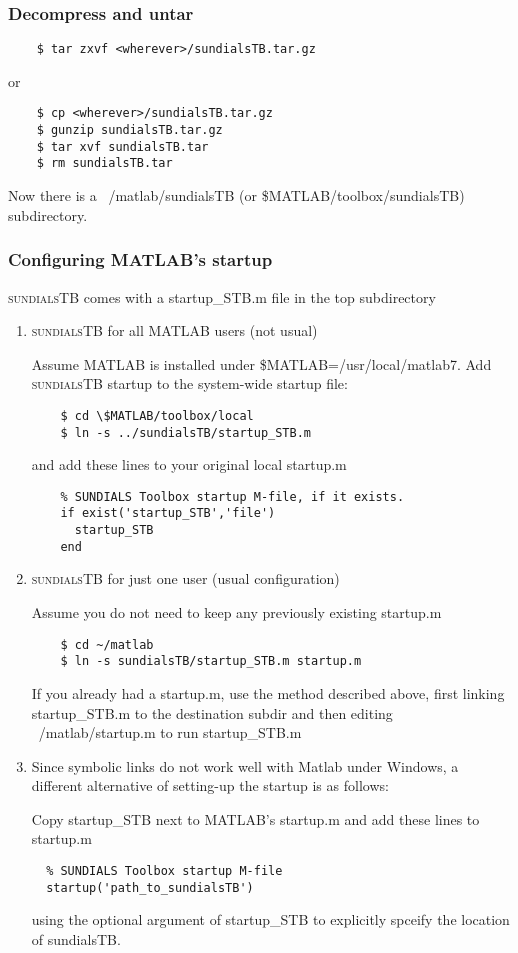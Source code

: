 \documentclass[titlepage,10pt]{article}
\newcommand{\sundialsTB}{{\normalfont\scshape sundialsTB}}
\begin{document}
\subsubsection{Decompress and untar}

\begin{verbatim}
    $ tar zxvf <wherever>/sundialsTB.tar.gz
\end{verbatim}
or
\begin{verbatim}
    $ cp <wherever>/sundialsTB.tar.gz
    $ gunzip sundialsTB.tar.gz
    $ tar xvf sundialsTB.tar
    $ rm sundialsTB.tar
\end{verbatim}
Now there is a ~/matlab/sundialsTB (or \$MATLAB/toolbox/sundialsTB) subdirectory.

\subsubsection{Configuring MATLAB's startup}

{\sundialsTB} comes with a startup\_STB.m file in the top subdirectory

\begin{enumerate}

\item 
  {\sundialsTB} for all MATLAB users (not usual)

  Assume MATLAB is installed under \$MATLAB=/usr/local/matlab7.
  Add {\sundialsTB} startup to the system-wide startup file:
\begin{verbatim}
    $ cd \$MATLAB/toolbox/local
    $ ln -s ../sundialsTB/startup_STB.m
\end{verbatim}
  and add these lines to your original local startup.m
\begin{verbatim}
    % SUNDIALS Toolbox startup M-file, if it exists.
    if exist('startup_STB','file')
      startup_STB
    end
\end{verbatim}

\item 
  {\sundialsTB} for just one user (usual configuration)

  Assume you do not need to keep any previously existing startup.m
\begin{verbatim}
    $ cd ~/matlab
    $ ln -s sundialsTB/startup_STB.m startup.m
\end{verbatim}
  If you already had a startup.m, use the method described above,
  first linking startup\_STB.m to the destination subdir and then
  editing ~/matlab/startup.m to run startup\_STB.m
  
\item 
  Since symbolic links do not work well with Matlab under Windows,
  a different alternative of setting-up the startup is as follows:
  
  Copy startup\_STB next to MATLAB's startup.m and add these lines
  to startup.m
  
\begin{verbatim}
  % SUNDIALS Toolbox startup M-file
  startup('path_to_sundialsTB')
\end{verbatim}  

  using the optional argument of startup\_STB to explicitly spceify
  the location of sundialsTB.
\end{enumerate}
\end{document}
